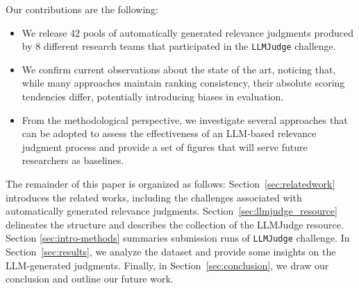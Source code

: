

Our contributions are the following:
\begin{itemize}
    \item We release 42 pools of automatically generated relevance judgments produced by 8 different research teams that participated in the \texttt{LLMJudge} challenge.
    \item We confirm current observations about the state of the art, noticing that, while many approaches maintain ranking consistency, their absolute scoring tendencies differ, potentially introducing biases in evaluation.
    \item From the methodological perspective, we investigate several approaches that can be adopted to assess the effectiveness of an LLM-based relevance judgment process and provide a set of figures that will serve future researchers as baselines. 
\end{itemize}

The remainder of this paper is organized as follows: Section~\ref{sec:relatedwork} introduces the related works, including the challenges associated with automatically generated relevance judgments. Section~\ref{sec:llmjudge_resource} delineates the structure and describes the collection of the LLMJudge resource. Section \ref{sec:intro-methods} summaries submission runs of \texttt{LLMJudge} challenge. In Section~\ref{sec:results}, we analyze the dataset and provide some insights on the \ac{LLM}-generated judgments. Finally, in Section~\ref{sec:conclusion}, we draw our conclusion and outline our future work.